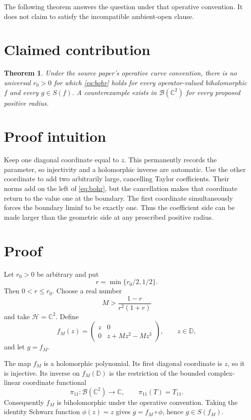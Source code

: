 \documentclass[11pt]{article}
\newtheorem{theorem}{Theorem}
\newcommand{\D}{\mathbb D}
\newcommand{\C}{\mathbb C}
\begin{document}
The following theorem answers the question under that operative convention.
It does not claim to satisfy the incompatible ambient-open clause.

\section{Claimed contribution}

\begin{theorem}\label{thm:main}
Under the source paper's operative curve convention, there is no universal
\(r_0>0\) for which \eqref{eq:bohr} holds for every operator-valued
biholomorphic \(f\) and every \(g\in S(f)\). A counterexample exists in
\(\mathcal B(\C^2)\) for every proposed positive radius.
\end{theorem}

\section{Proof intuition}

Keep one diagonal coordinate equal to \(z\). This permanently records the
parameter, so injectivity and a holomorphic inverse are automatic. Use the
other coordinate to add two arbitrarily large, cancelling Taylor
coefficients. Their norms add on the left of \eqref{eq:bohr}, but the
cancellation makes that coordinate return to the value one at the boundary.
The first coordinate simultaneously forces the boundary liminf to be exactly
one. Thus the coefficient side can be made larger than the geometric side at
any prescribed positive radius.

\section{Proof}

Let \(r_0>0\) be arbitrary and put
\[
 r=\min\{r_0/2,1/2\}.
\]
Then \(0<r\leq r_0\). Choose a real number
\begin{equation}\label{eq:Mchoice}
 M>\frac{1-r}{r^2(1+r)}
\end{equation}
and take \(\mathcal H=\C^2\). Define
\begin{equation}\label{eq:fdef}
 f_M(z)=
 \begin{pmatrix}
 z&0\\
 0&z+Mz^2-Mz^3
 \end{pmatrix},
 \qquad z\in\D,
\end{equation}
and let \(g=f_M\).

The map \(f_M\) is a holomorphic polynomial. Its first diagonal coordinate is
\(z\), so it is injective. Its inverse on \(f_M(\D)\) is the restriction of
the bounded complex-linear coordinate functional
\[
 \pi_{11}:\mathcal B(\C^2)\longrightarrow\C,
 \qquad \pi_{11}(T)=T_{11}.
\]
Consequently \(f_M\) is biholomorphic under the operative convention.
Taking the identity Schwarz function \(\phi(z)=z\) gives
\(g=f_M\circ\phi\), hence \(g\in S(f_M)\).
\end{document}
